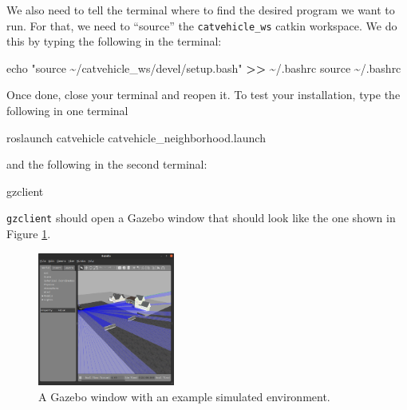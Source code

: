 \documentclass[
]{article}
\newenvironment{Shaded}{\begin{snugshade}}{\end{snugshade}}
\newcommand{\BuiltInTok}[1]{#1}
\newcommand{\ExtensionTok}[1]{#1}
\newcommand{\NormalTok}[1]{#1}
\newcommand{\OperatorTok}[1]{\textcolor[rgb]{0.81,0.36,0.00}{\textbf{#1}}}
\newcommand{\StringTok}[1]{\textcolor[rgb]{0.31,0.60,0.02}{#1}}
\begin{document}
We also need to tell the terminal where to find the desired program we
want to run. For that, we need to ``source'' the \texttt{catvehicle\_ws}
catkin workspace. We do this by typing the following in the terminal:

\begin{Shaded}
\begin{Highlighting}[]
\BuiltInTok{echo} \StringTok{"source \textasciitilde{}/catvehicle\_ws/devel/setup.bash"} \OperatorTok{\textgreater{}\textgreater{}}\NormalTok{ \textasciitilde{}/.bashrc}
\BuiltInTok{source}\NormalTok{ \textasciitilde{}/.bashrc}
\end{Highlighting}
\end{Shaded}

Once done, close your terminal and reopen it. To test your installation,
type the following in one terminal

\begin{Shaded}
\begin{Highlighting}[]
\ExtensionTok{roslaunch}\NormalTok{ catvehicle catvehicle\_neighborhood.launch}
\end{Highlighting}
\end{Shaded}

and the following in the second terminal:

\begin{Shaded}
\begin{Highlighting}[]
\ExtensionTok{gzclient}
\end{Highlighting}
\end{Shaded}

\texttt{gzclient} should open a Gazebo window that should look like the
one shown in Figure \ref{fig:Gazebo_001.png}.

\begin{figure}[htbp]
\centering
\includegraphics[width=0.4\textwidth]{Gazebo_001.png}
\caption{A Gazebo window with an example simulated environment.}
\label{fig:Gazebo_001.png}
\end{figure}
\end{document}
